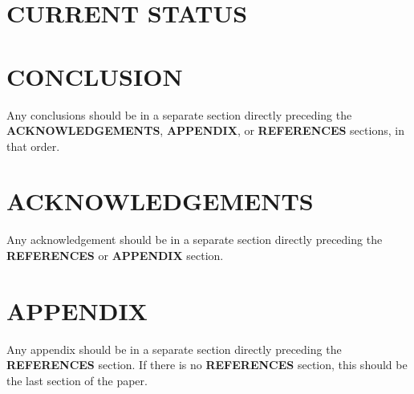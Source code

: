 \documentclass[a4paper,
               biblatex,     %
               keeplastbox,   %
               ]{jacow}
\begin{document}
\section{CURRENT STATUS}


\section{CONCLUSION}

Any conclusions should be in a separate section directly preceding
the \textbf{ACKNOWLEDGEMENTS}, \textbf{APPENDIX}, or \textbf{REFERENCES} sections, in that
order.

\section{ACKNOWLEDGEMENTS}
Any acknowledgement should be in a separate section directly preceding
the \textbf{REFERENCES} or \textbf{APPENDIX} section.


\section{APPENDIX}
Any appendix should be in a separate section directly preceding
the \textbf{REFERENCES} section. If there is no \textbf{REFERENCES} section,
this should be the last section of the paper.

\printbibliography
\end{document}
